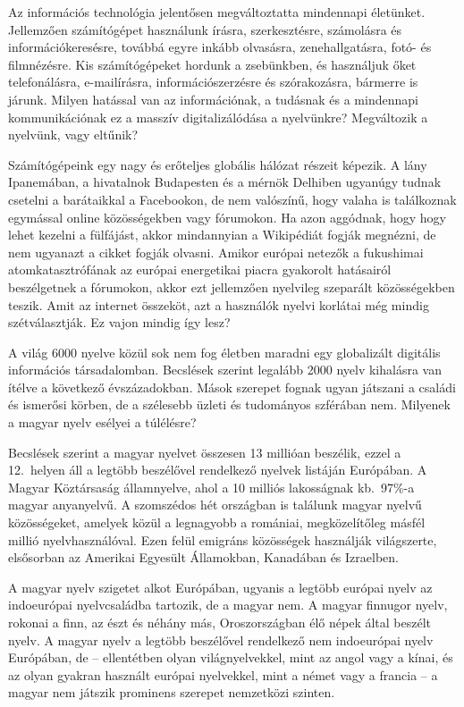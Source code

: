 \begin{multicols}{2}
Az információs technológia jelentősen megváltoztatta mindennapi életünket. Jel\-lem\-ző\-en számítógépet használunk írásra, szerkesztésre, számolásra és in\-for\-má\-ció\-ke\-re\-sés\-re, továbbá egyre inkább olvasásra, zenehallgatásra, fotó- és filmnézésre. Kis szá\-mí\-tó\-gé\-pe\-ket hordunk a zsebünkben, és használjuk őket telefonálásra, e-mailírásra, információszerzésre és szórakozásra, bármerre is járunk. Milyen hatással van az információnak, a tudásnak és a mindennapi kommunikációnak ez a masszív digitalizálódása a nyelvünkre? Megváltozik a nyelvünk, vagy eltűnik? 

Számítógépeink egy nagy és erőteljes globális hálózat részeit képezik. A lány Ipa\-ne\-má\-ban, a hivatalnok Budapesten és a mérnök Delhiben ugyanúgy tudnak csetelni a barátaikkal a Facebookon, de nem valószínű, hogy valaha is találkoznak egymással online közösségekben vagy fórumokon. Ha azon aggódnak, hogy hogy lehet kezelni a fülfájást, akkor mindannyian a Wikipédiát fogják megnézni, de nem ugyanazt a cikket fogják olvasni. Amikor európai netezők a fukushimai atomkatasztrófának az európai energetikai piacra gyakorolt hatásairól beszélgetnek a fórumokon, akkor ezt jellemzően nyelvileg szeparált közösségekben teszik. Amit az internet összeköt, azt a használók nyelvi korlátai még mindig szétválasztják. Ez vajon mindig így lesz?

A világ 6000 nyelve közül sok nem fog életben maradni egy globalizált digitális információs társadalomban. Becslések szerint legalább 2000 nyelv kihalásra van ítélve a következő évszázadokban. Mások szerepet fognak ugyan játszani a családi és ismerősi körben, de a szélesebb üzleti és tudományos szférában nem. Milyenek a magyar nyelv esélyei a túlélésre?

Becs\-lé\-sek szerint a magyar nyelvet összesen 13 millióan beszélik, ezzel a 12.~helyen áll a legtöbb beszélővel rendelkező nyelvek listáján Európában. A Magyar Köztársaság államnyelve, ahol a 10 milliós lakosságnak kb.~97\%-a magyar anyanyelvű. A szomszédos hét országban is találunk ma\-gyar nyelvű közösségeket, amelyek közül a legnagyobb a romániai, megközelítőleg másfél millió nyelvhasználóval. Ezen felül emig\-ráns közösségek használják világszerte, elsősorban az Amerikai Egyesült Államokban, Kanadában és Izraelben.   

A magyar nyelv szigetet alkot Európában, ugyanis a legtöbb európai nyelv az indoeurópai nyelvcsaládba tartozik, de a magyar nem. A magyar finnugor nyelv, rokonai a finn, az észt és néhány más, Oroszországban élő népek által beszélt nyelv. A magyar nyelv a legtöbb beszélővel rendelkező nem indoeurópai nyelv Európában, de -- ellentétben olyan világnyelvekkel, mint az angol vagy a kínai, és az olyan gyakran használt európai nyelvekkel, mint a német vagy a francia -- a magyar nem játszik prominens szerepet nemzetközi szinten. 


\end{multicols}
